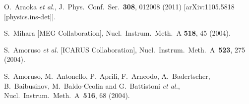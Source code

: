 \documentclass{cernyrep}
\begin{document}
\begin{thebibliography}{99}
  O.~Araoka {\it et al.},
  J.\ Phys.\ Conf.\ Ser.\  {\bf 308}, 012008 (2011)
  [arXiv:1105.5818 [physics.ins-det]].

S.~Mihara [MEG Collaboration],
Nucl.\ Instrum.\ Meth.\ A {\bf 518}, 45 (2004).

  S.~Amoruso {\it et al.} [ICARUS Collaboration],
  Nucl.\ Instrum.\ Meth.\ A\ {\bf 523}, 275  (2004).

  S.~Amoruso, M.~Antonello, P.~Aprili, F.~Arneodo, A.~Badertscher, B.~Baibusinov, M.~Baldo-Ceolin and G.~Battistoni {\it et al.},
  Nucl.\ Instrum.\ Meth.\ A\ {\bf 516}, 68  (2004).
\end{thebibliography}
\end{document}
